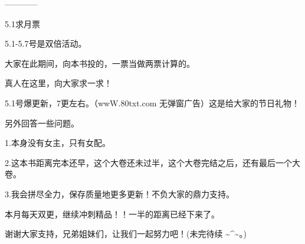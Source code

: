 \begin{this_body}
------------

5.1求月票

5.1-5.7号是双倍活动。

大家在此期间，向本书投的，一票当做两票计算的。

真人在这里，向大家求一求！

5.1号爆更新，7更左右。（wwW.80txt.com 无弹窗广告）这是给大家的节日礼物！

另外回答一些问题。

1.本身没有女主，只有女配。

2.这本书距离完本还早，这个大卷还未过半，这个大卷完结之后，还有最后一个大卷。

3.我会拼尽全力，保存质量地更多更新！不负大家的鼎力支持。

本月每天双更，继续冲刺精品！！一半的距离已经下来了。

谢谢大家支持，兄弟姐妹们，让我们一起努力吧！(未完待续 \~{}\^{}\~{}。)

\end{this_body}

